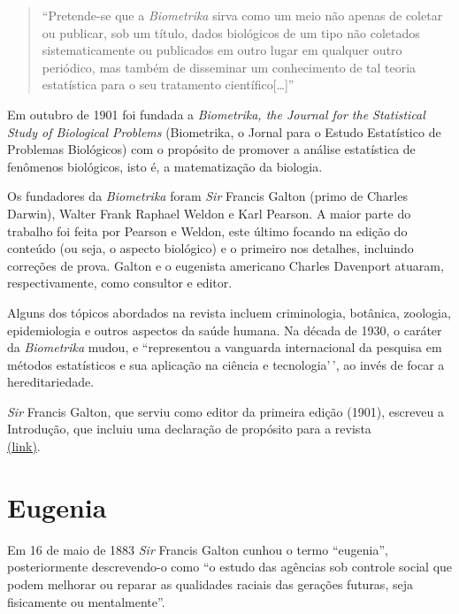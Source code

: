 \documentclass[
]{book}
\begin{document}
\hfill\break

\begin{quote}
``Pretende-se que a \emph{Biometrika} sirva como um meio não apenas de coletar ou publicar, sob um título, dados biológicos de um tipo não coletados sistematicamente ou publicados em outro lugar em qualquer outro periódico, mas também de disseminar um conhecimento de tal teoria estatística para o seu tratamento científico{[}\ldots{]}''
\end{quote}

\hfill\break

Em outubro de 1901 foi fundada a \emph{Biometrika, the Journal for the Statistical Study of Biological Problems} (Biometrika, o Jornal para o Estudo Estatístico de Problemas Biológicos) com o propósito de promover a análise estatística de fenômenos biológicos, isto é, a matematização da biologia.

Os fundadores da \emph{Biometrika} foram \emph{Sir} Francis Galton (primo de Charles Darwin), Walter Frank Raphael Weldon e Karl Pearson. A maior parte do trabalho foi feita por Pearson e Weldon, este último focando na edição do conteúdo (ou seja, o aspecto biológico) e o primeiro nos detalhes, incluindo correções de prova. Galton e o eugenista americano Charles Davenport atuaram, respectivamente, como consultor e editor.

Alguns dos tópicos abordados na revista incluem criminologia, botânica, zoologia, epidemiologia e outros aspectos da saúde humana. Na década de 1930, o caráter da \emph{Biometrika} mudou, e ``representou a vanguarda internacional da pesquisa em métodos estatísticos e sua aplicação na ciência e tecnologia'\,', ao invés de focar a hereditariedade.

\emph{Sir} Francis Galton, que serviu como editor da primeira edição (1901), escreveu a Introdução, que incluiu uma declaração de propósito para a revista\\
\href{https://academic.oup.com/biomet/article-abstract/1/1/1/192192?redirectedFrom=fulltext}{(link)}.

\hypertarget{eugenia}{%
\section{Eugenia}\label{eugenia}}

Em 16 de maio de 1883 \emph{Sir} Francis Galton cunhou o termo ``eugenia'', posteriormente descrevendo-o como ``o estudo das agências sob controle social que podem melhorar ou reparar as qualidades raciais das gerações futuras, seja fisicamente ou mentalmente''.
\end{document}
